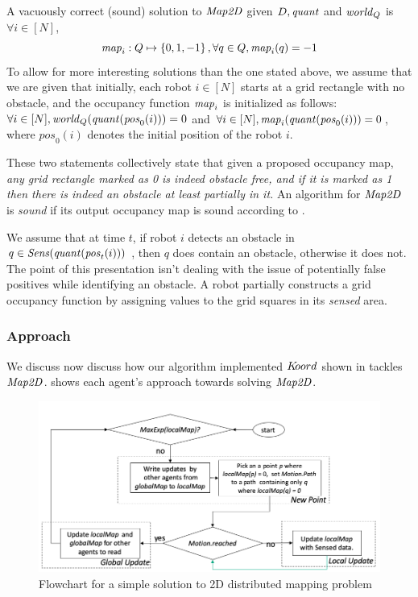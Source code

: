  
A vacuously correct (sound) solution to $\mathit{Map2D}$ given $D, \mathit{quant}$ and $\mathit{world}_Q$ is $\forall i \in [N]$, $$\mathit{map}_i : Q \mapsto \left\{0,1,-1\right\}, \forall  q \in Q , \mathit{map}_i(q)= -1$$ To allow for more interesting solutions than the one stated above, we assume that we are given that initially, each robot $i\in[N]$ starts at a grid rectangle with no obstacle, and the occupancy function $\mathit{map}_i$ is initialized as follows:
 $\forall i \in [N], \mathit{world}_Q(\mathit{quant}(\mathit{pos}_0(i))) = 0$ and 
 $\forall i \in [N], \mathit{map}_i(\mathit{quant}(\mathit{pos}_0(i))) = 0$,
  where $\mathit{pos}_0(i)$ denotes the initial position of the robot $i$. 


These two statements collectively state that given a proposed occupancy map, \emph{any grid rectangle marked as 0 is indeed obstacle free, and if it is marked as 1 then there is indeed an obstacle at least partially in it.}  An algorithm for $\mathit{Map2D}$ is \emph{sound} if its output occupancy map is sound according to .

We assume that at time $t$, if robot $i$ detects an obstacle in $q \in \mathit{Sens}(\mathit{quant}(\mathit{pos}_t(i)))$ , then $q$ does contain an obstacle, otherwise it does not. The point of this presentation isn't dealing with the issue of potentially false positives while identifying an obstacle. A robot partially constructs a grid occupancy function by assigning values to the grid squares in its \emph{sensed} area.


\subsubsection{Approach}
We discuss now discuss how our algorithm implemented $K\kern-2pt oord$ shown in  tackles $\mathit{Map2D}$.  shows each agent's approach towards solving $\mathit{Map2D}$. 

\begin{figure}[!htbp]
    \centering
    \includegraphics[width=\linewidth]{figs/map_flowchart.png}
    \caption{Flowchart for a simple solution to 2D distributed mapping problem\vspace{-2mm}}
    \label{fig:flowmap}
\end{figure}

